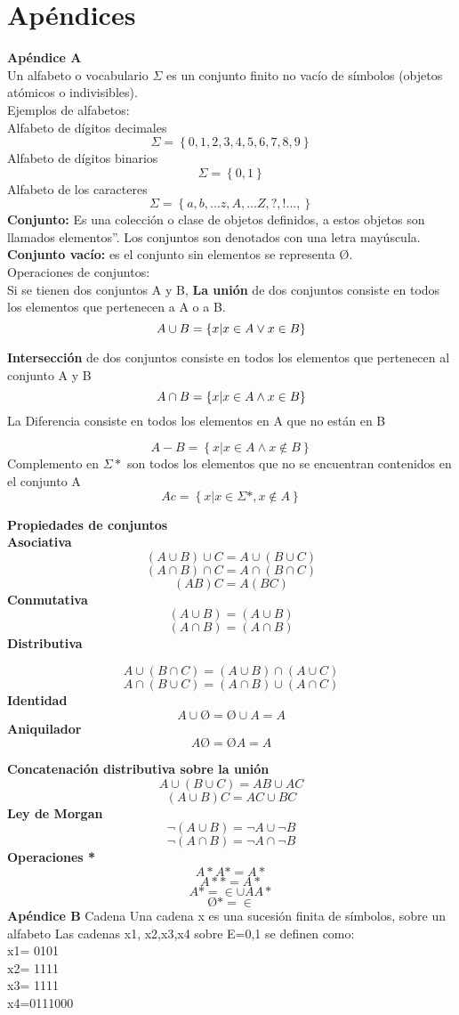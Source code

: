\documentclass{llncs}
\begin{document}
\section{Apéndices}
\textbf{Apéndice  A} \\
Un alfabeto o vocabulario $\Sigma  $ es un conjunto finito no vacío de símbolos (objetos atómicos o indivisibles).\\
 Ejemplos de alfabetos:\\
Alfabeto de dígitos decimales
\[
\Sigma=
\left\lbrace
0,1,2,3,4,5,6,7,8,9
\right\rbrace
\]
Alfabeto de dígitos binarios
\[
\Sigma=
\left\lbrace
0,1
\right\rbrace
\]
Alfabeto de los caracteres 
\[
\Sigma=
\left\lbrace
a, b,...z, A,...Z, ?,!..., 
\right\rbrace
\]
\textbf{Conjunto:} Es una colección o clase de objetos definidos, a estos objetos son llamados elementos”. Los conjuntos son denotados con una letra mayúscula.\\
\textbf{Conjunto vacío:} es el conjunto sin elementos se representa Ø.\\
Operaciones de conjuntos:\\
Si se tienen dos conjuntos A y B, \textbf{La unión} de dos conjuntos consiste en todos los elementos que pertenecen a A o a B.
\[
A \cup B =
\left\lbrace
 x | x \in A \bigskip    \vee  x \in B 
\right\rbrace
\]

 \textbf{Intersección} de dos conjuntos  consiste en todos los elementos que pertenecen al conjunto A y B
\[
A \cap B =
\left\lbrace
 x | x \in A \bigskip  \wedge    x \in B 
\right\rbrace
\]
La Diferencia consiste en todos los elementos en A que no están en B

\[
A-B  =
\left\lbrace
 x | x \in A   \wedge  x \not\in B 
\right\rbrace
\]
 Complemento en $\Sigma * $ son todos los elementos que no se encuentran contenidos en el conjunto A
\[
Ac  =
\left\lbrace
 x | x \in \Sigma*, x \not\in A
\right\rbrace
\]

\textbf{Propiedades de conjuntos}\\
\textbf{Asociativa}
 \[
 (A \cup B) \cup C = A \cup(B \cup C)  
  \]
\[
 (A \cap B) \cap C = A \cap(B \cap C)  
  \]
\[
 (AB)C = A(BC)  
  \]
  \textbf{Conmutativa}
 \[
 (A \cup B) = (A \cup B)  
  \]
   \[
 (A \cap B) = (A \cap B)  
  \]
 \textbf{Distributiva}

 \[
 A \cup (B \cap C) = (A \cup B) \cap (A \cup C)  
  \]
   \[
A \cap (B \cup C) = (A \cap B) \cup (A \cap C)
  \] 
 \textbf{Identidad}
 \[
 A \cup Ø = Ø \cup A = A
  \]
 \textbf{Aniquilador}
 \[
 A  Ø = Ø  A = A
  \]

   \textbf{Concatenación distributiva sobre la unión}
 \[
 A \cup (B \cup C) = AB \cup AC
  \]
\[
( A \cup B)  C = AC \cup BC
  \]
  \textbf{Ley de Morgan }
 \[
\neg (A \cup B)= \neg A \cup  \neg B
  \]
\[
\neg(A \cap B)= \neg A \cap  \neg B
  \] 
\textbf{Operaciones *}
\[ 
A* A* = A*
\]
\[ 
A** =A*
  \] 
\[ 
A*= { \in } \cup AA*
  \]
\[ 
Ø*={\in}
  \] 
  \textbf{Apéndice  B}
  Cadena
Una cadena x es una sucesión finita de símbolos, sobre un alfabeto
Las cadenas x1, x2,x3,x4 sobre E={0,1} se definen como:\\
x1= 0101 \\
x2= 1111 \\
x3= 1111 \\
x4=0111000 \\
\end{document}
